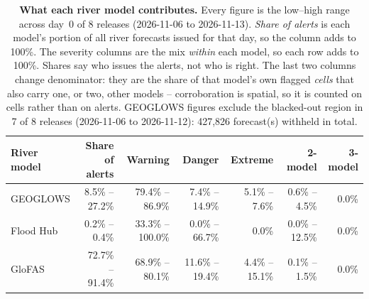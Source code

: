 \begin{table}[htbp]
\centering
\small
\setlength{\tabcolsep}{3pt}
\begin{tabular}{l r r r r r r}
\toprule
River model & Share of alerts & Warning & Danger & Extreme & 2-model & 3-model \\
\midrule
  GEOGLOWS & 8.5\% -- 27.2\% & 79.4\% -- 86.9\% & 7.4\% -- 14.9\% & 5.1\% -- 7.6\% & 0.6\% -- 4.5\% & 0.0\% \\
  Flood Hub & 0.2\% -- 0.4\% & 33.3\% -- 100.0\% & 0.0\% -- 66.7\% & 0.0\% & 0.0\% -- 12.5\% & 0.0\% \\
  GloFAS & 72.7\% -- 91.4\% & 68.9\% -- 80.1\% & 11.6\% -- 19.4\% & 4.4\% -- 15.1\% & 0.1\% -- 1.5\% & 0.0\% \\
\bottomrule
\end{tabular}
\caption[What each river model contributes]{%
  \textbf{What each river model contributes.}
  Every figure is the low--high range across day~0 of
  8 releases (2026-11-06 to 2026-11-13).
  \emph{Share of alerts} is each model's portion of all river forecasts
  issued for that day, so the column adds to 100\%. The severity columns are
  the mix \emph{within} each model, so each row adds to 100\%. Shares say
  who issues the alerts, not who is right.
  The last two columns change denominator: they are the share of that model's
  own flagged \emph{cells} that also carry one, or two, other models --
  corroboration is spatial, so it is counted on cells rather than on
  alerts. GEOGLOWS figures exclude the blacked-out region in 7 of 8 releases (2026-11-06 to 2026-11-12): 427,826 forecast(s) withheld in total.}
\label{tab:model-coverage}
\end{table}
